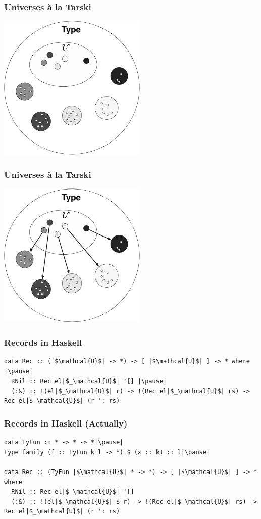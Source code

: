 \documentclass[tikz, 12pt]{beamer}
\begin{document}
\begin{frame}
  \frametitle{Universes \`a la Tarski}
  \begin{center}
    \includegraphics[width=2.8in]{universe-populated.pdf}
  \end{center}
\end{frame}

\begin{frame}
  \frametitle{Universes \`a la Tarski}
  \begin{center}
    \includegraphics[width=2.8in]{universe-interpretation.pdf}
  \end{center}
\end{frame}

\begin{frame}[fragile]
  \frametitle{Records in Haskell}\pause
  \begin{lstlisting}
data Rec :: (|$\mathcal{U}$| -> *) -> [ |$\mathcal{U}$| ] -> * where |\pause|
  RNil :: Rec el|$_\mathcal{U}$| '[] |\pause|
  (:&) :: !(el|$_\mathcal{U}$| r) -> !(Rec el|$_\mathcal{U}$| rs) -> Rec el|$_\mathcal{U}$| (r ': rs)
  \end{lstlisting}
\end{frame}
\begin{frame}[fragile]
  \frametitle{Records in Haskell (Actually)}\pause

  \begin{lstlisting}
data TyFun :: * -> * -> *|\pause|
type family (f :: TyFun k l -> *) $ (x :: k) :: l|\pause|

data Rec :: (TyFun |$\mathcal{U}$| * -> *) -> [ |$\mathcal{U}$| ] -> * where
  RNil :: Rec el|$_\mathcal{U}$| '[]
  (:&) :: !(el|$_\mathcal{U}$| $ r) -> !(Rec el|$_\mathcal{U}$| rs) -> Rec el|$_\mathcal{U}$| (r ': rs)
  \end{lstlisting}
\end{frame}
\end{document}
